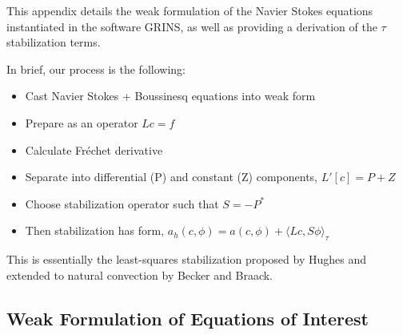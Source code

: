 \label{app:stab}

This appendix details the weak formulation of the Navier Stokes
equations instantiated in the software GRINS, as well as providing a
derivation of the $\tau$ stabilization terms. 

In brief, our process is the following: 

\begin{itemize}
 \item Cast Navier Stokes + Boussinesq equations into weak form
 \item Prepare as an operator $Lc=f$
 \item Calculate Fr\'echet derivative
 \item Separate into differential (P) and constant (Z) components,
       $L'[c] = P + Z$
 \item Choose stabilization operator such that $S = -P^*$
 \item Then stabilization has form, $a_h(c,\phi) = a(c,\phi) + \langle
       Lc,S\phi \rangle_\tau$
\end{itemize}

This is essentially the least-squares stabilization proposed by Hughes
and extended to natural convection by Becker and Braack. 

%
%

\subsection{Weak Formulation of Equations of Interest}

